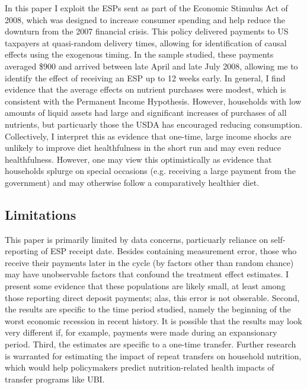 \documentclass[12pt]{article}
\begin{document}
In this paper I exploit the ESPs sent as part of the Economic Stimulus Act of 2008, which was designed to increase consumer spending and help reduce the downturn from the 2007 financial crisis.
This policy delivered payments to US taxpayers at quasi-random delivery times, allowing for identification of causal effects using the exogenous timing.
In the sample studied, these payments averaged \$900 and arrived between late April and late July 2008, allowing me to identify the effect of receiving an ESP up to 12 weeks early.
In general, I find evidence that the average effects on nutrient purchases were modest, which is consistent with the Permanent Income Hypothesis.
However, households with low amounts of liquid assets had large and significant increases of purchases of all nutrients, but particuarly those the USDA has encouraged reducing consumption.
Collectively, I interpret this as evidence that one-time, large income shocks are unlikely to improve diet healthfulness in the short run and may even reduce healthfulness.
However, one may view this optimistically as evidence that households splurge on special occasions (e.g. receiving a large payment from the government) and may otherwise follow a comparatively healthier diet.

\subsection{Limitations}

This paper is primarily limited by data concerns, particuarly reliance on self-reporting of ESP receipt date.
Besides containing measurement error, those who receive their payments later in the cycle (by factors other than random chance) may have unobservable factors that confound the treatment effect estimates.
I present some evidence that these populations are likely small, at least among those reporting direct deposit payments; alas, this error is not obserable.
Second, the results are specific to the time period studied, namely the beginning of the worst economic recession in recent history.
It is possible that the results may look very different if, for example, payments were made during an expansionary period.
Third, the estimates are specific to a one-time transfer.
Further research is warranted for estimating the impact of repeat transfers on household nutrition, which would help policymakers predict nutrition-related health impacts of transfer programs like UBI.


\clearpage
\printbibliography
\end{document}
